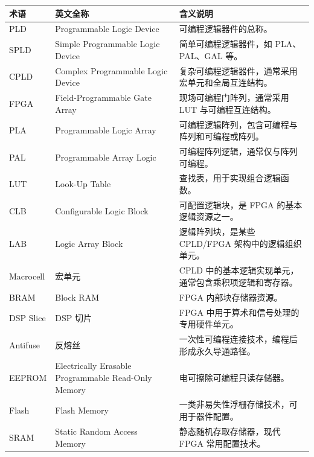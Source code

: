\begin{longtable}[]{@{}
  >{\raggedright\arraybackslash}p{}
  >{\raggedright\arraybackslash}p{}
  >{\raggedright\arraybackslash}p{}@{}}
\toprule\noalign{}
\begin{minipage}[b]{\linewidth}\raggedright
术语
\end{minipage} & \begin{minipage}[b]{\linewidth}\raggedright
英文全称
\end{minipage} & \begin{minipage}[b]{\linewidth}\raggedright
含义说明
\end{minipage} \\
\midrule\noalign{}
\endhead
\bottomrule\noalign{}
\endlastfoot
PLD & Programmable Logic Device & 可编程逻辑器件的总称。 \\
SPLD & Simple Programmable Logic Device & 简单可编程逻辑器件，如
PLA、PAL、GAL 等。 \\
CPLD & Complex Programmable Logic Device &
复杂可编程逻辑器件，通常采用宏单元和全局互连结构。 \\
FPGA & Field-Programmable Gate Array & 现场可编程门阵列，通常采用 LUT
与可编程互连结构。 \\
PLA & Programmable Logic Array &
可编程逻辑阵列，包含可编程与阵列和可编程或阵列。 \\
PAL & Programmable Array Logic & 可编程阵列逻辑，通常仅与阵列可编程。 \\
LUT & Look-Up Table & 查找表，用于实现组合逻辑函数。 \\
CLB & Configurable Logic Block & 可配置逻辑块，是 FPGA
的基本逻辑资源之一。 \\
LAB & Logic Array Block & 逻辑阵列块，是某些 CPLD/FPGA
架构中的逻辑组织单元。 \\
Macrocell & 宏单元 & CPLD
中的基本逻辑实现单元，通常包含乘积项逻辑和寄存器。 \\
BRAM & Block RAM & FPGA 内部块存储器资源。 \\
DSP Slice & DSP 切片 & FPGA 中用于算术和信号处理的专用硬件单元。 \\
Antifuse & 反熔丝 & 一次性可编程连接技术，编程后形成永久导通路径。 \\
EEPROM & Electrically Erasable Programmable Read-Only Memory &
电可擦除可编程只读存储器。 \\
Flash & Flash Memory & 一类非易失性浮栅存储技术，可用于器件配置。 \\
SRAM & Static Random Access Memory & 静态随机存取存储器，现代 FPGA
常用配置技术。 \\
\end{longtable}

